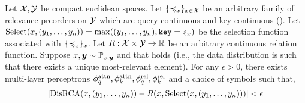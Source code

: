 \documentclass{article}
\begin{document}
\begin{theorem}\label{theorem:func_class}
  Let ${\mathcal{X}}, {\mathcal{Y}}$ be compact euclidean spaces. Let $\{\preccurlyeq_x\}_{x \in {\mathcal{X}}}$ be an arbitrary family of relevance preorders on ${\mathcal{Y}}$ which are query-continuous and key-continuous (). Let $\mathrm{Select}(x, (y_1, \ldots, y_n)) = \max((y_1, \ldots, y_n), \mathtt{key}=\preccurlyeq_x)$ be the selection function associated with $\{\preccurlyeq_x\}_{x}$. Let $R: {\mathcal{X}} \times {\mathcal{Y}} \to \mathbb{R}$ be an arbitrary continuous relation function. Suppose $x, \bm{y} \sim {\mathbb{P}}_{x, \bm{y}}$ and that  holds (i.e., the data distribution is such that there exists a unique most-relevant element). For any $\epsilon > 0$, there exists multi-layer perceptrons $\phi_q^{\mathrm{attn}}, \phi_k^{\mathrm{attn}}, \phi_q^{\mathrm{rel}}, \phi_k^{\mathrm{rel}}$ and a choice of symbols such that,
  \begin{equation*}
    \left\lvert\mathrm{DisRCA}(x, (y_1, \ldots, y_n)) - R(x, \mathrm{Select}(x, (y_1, \ldots, y_n)))\right\rvert < \epsilon
  \end{equation*}
\end{theorem}
\end{document}
